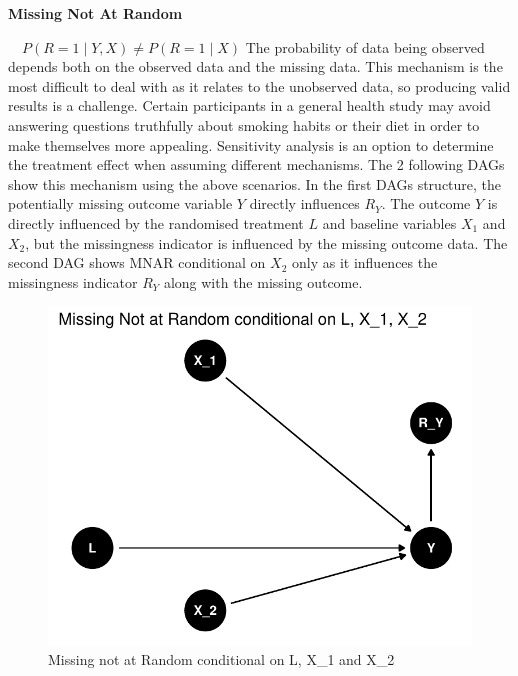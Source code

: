 \documentclass{article}
\newcommand{\pandocbounded}[1]{#1}
\begin{document}
\textbf{Missing Not At Random}

\(\quad P(R = 1 \mid Y, X) \ne P(R = 1 \mid X)\) The probability of data
being observed depends both on the observed data and the missing data.
This mechanism is the most difficult to deal with as it relates to the
unobserved data, so producing valid results is a challenge. Certain
participants in a general health study may avoid answering questions
truthfully about smoking habits or their diet in order to make
themselves more appealing. Sensitivity analysis is an option to
determine the treatment effect when assuming different mechanisms. The 2
following DAGs show this mechanism using the above scenarios. In the
first DAGs structure, the potentially missing outcome variable \(Y\)
directly influences \(R_Y\). The outcome \(Y\) is directly influenced by
the randomised treatment \(L\) and baseline variables \(X_1\) and
\(X_2\), but the missingness indicator is influenced by the missing
outcome data. The second DAG shows MNAR conditional on \(X_2\) only as
it influences the missingness indicator \(R_Y\) along with the missing
outcome.

\begin{figure}
\centering
\pandocbounded{\includegraphics[keepaspectratio]{Final_Report_files/figure-latex/unnamed-chunk-4-1.pdf}}
\caption{Missing not at Random conditional on L, X\_1 and X\_2}
\end{figure}
\end{document}
